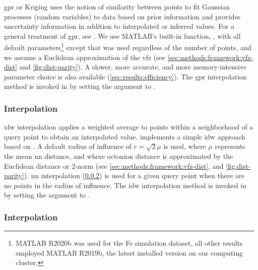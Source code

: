 \documentclass[final,twocolumn,12pt]{elsarticle}
\begin{document}
\Gls{gpr} or Kriging uses the notion of similarity between points to fit Gaussian processes (random variables) to data based on prior information and provides uncertainty information in addition to interpolated or inferred values. For a general treatment of \gls{gpr}, see \citet{rasmussenGaussianProcessesMachine2006}. We use MATLAB's built-in function, , with all default parameters\footnote{MATLAB R2020b was used for the Fe simulation dataset, all other results employed MATLAB R2019b, the latest installed version on our computing cluster.} except that  was used regardless of the number of \inpt{} points, and we assume a Euclidean approximation of the \gls{vfz} (see \cref{sec:methods:framework:vfz-dist} and \cref{fig:dist-parity}). A slower, more accurate, and more memory-intensive  parameter choice is also available (\cref{sec:results:efficiency}). The \gls{gpr} interpolation method is invoked in  by setting the  argument to .

\subsubsection{ Interpolation}
\label{sec:methods:interp:idw}


\Gls{idw} interpolation applies a weighted average to points within a neighborhood of a query point to obtain an interpolated value.  implements a simple \gls{idw} approach based on \cite{tovarInverseDistanceWeight2020}. A default radius of influence of $r=\sqrt{2} \mu$ is used, where $\mu$ represents the mean \gls{nn} distance, and where octonion distance is approximated by the Euclidean distance or 2-norm (see \cref{sec:methods:framework:vfz-dist}, and \cref{fig:dist-parity}). \gls{nn} interpolation (\cref{sec:methods:interp:nn}) is used for a given query point when there are no \inpt{} points in the radius of influence. The \gls{idw} interpolation method is invoked in  by setting the  argument to .

\subsubsection{ Interpolation}
\label{sec:methods:interp:nn}
\end{document}

